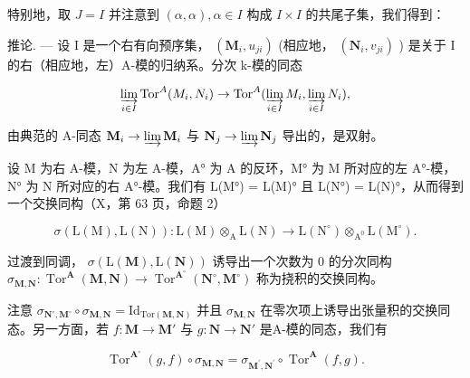 特别地，取 \(J = I\) 并注意到 \((\alpha, \alpha), \alpha \in I\) 构成 \(I \times I\) 的共尾子集，我们得到：

推论. --- 设 I 是一个右有向预序集， \((\mathbf{M}_{i}, u_{ji})\) (相应地， \((\mathbf{N}_{i}, v_{ji})\) ) 是关于 I 的右（相应地，左）A-模的归纳系。分次 k-模的同态

\[
\varinjlim_ {i \in I} \operatorname{Tor} ^ {A} (M _ {i}, N _ {i}) \rightarrow \operatorname{Tor} ^ {A} (\varinjlim_ {i \in I} M _ {i}, \varinjlim_ {i \in I} N _ {i}),
\]

由典范的 A-同态 \(\mathbf{M}_i\to \varinjlim \mathbf{M}_i\) 与 \(\mathbf{N}_j\to \varinjlim \mathbf{N}_j\) 导出的，是双射。

设 M 为右 A-模，N 为左 A-模，A° 为 A 的反环，M° 为 M 所对应的左 A°-模，N° 为 N 所对应的右 A°-模。我们有 L(M°) = L(M)° 且 L(N°) = L(N)°，从而得到一个交换同构（X，第 63 页，命题 2）

\[
\sigma (\mathrm{L} (\mathrm{M}), \mathrm{L} (\mathrm{N})): \mathrm{L} (\mathrm{M}) \otimes_ {\mathrm{A}} \mathrm{L} (\mathrm{N}) \rightarrow \mathrm{L} (\mathrm{N} ^ {\circ}) \otimes_ {\mathrm{A} ^ {0}} \mathrm{L} (\mathrm{M} ^ {\circ}).
\]

过渡到同调， \(\sigma(\mathrm{L}(\mathbf{M}),\mathrm{L}(\mathbf{N}))\) 诱导出一个次数为 0 的分次同构 \(\sigma_{\mathbf{M},\mathbf{N}}:\operatorname{Tor}^{\mathbf{A}}(\mathbf{M},\mathbf{N})\to\operatorname{Tor}^{\mathbf{A}^{\circ}}(\mathbf{N}^{\circ},\mathbf{M}^{\circ})\) 称为挠积的交换同构。

注意 \(\sigma_{\mathbf{N}^{\circ},\mathbf{M}^{\circ}}\circ\sigma_{\mathbf{M},\mathbf{N}}=\mathrm{Id}_{\mathrm{Tor}\left(\mathbf{M},\mathbf{N}\right)}\) 并且 \(\sigma_{\mathbf{M},\mathbf{N}}\) 在零次项上诱导出张量积的交换同态。另一方面，若 \(f:\mathbf{M}\to\mathbf{M}'\) 与 \(g:\mathbf{N}\to\mathbf{N}'\) 是A-模的同态，我们有

\[
\operatorname{Tor} ^ {\mathbf {A} ^ {\circ}} (g, f) \circ \sigma_ {\mathbf {M}, \mathbf {N}} = \sigma_ {\mathbf {M} ^ {\prime}, \mathbf {N} ^ {\prime}} \circ \operatorname{Tor} ^ {\mathbf {A}} (f, g).
\]

